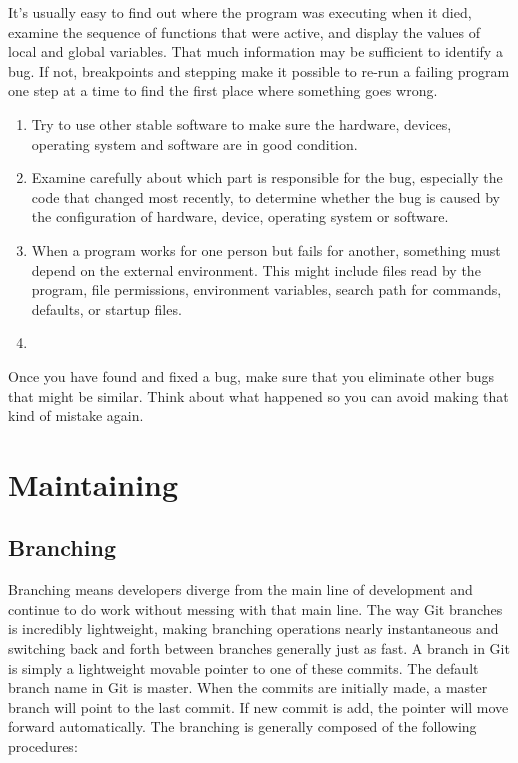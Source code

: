 \documentclass[draftclsnofoot,journal,onecolumn,12pt]{IEEEtran}
\begin{document}
It's usually easy to find out where the program was executing when it died, examine the sequence of functions that were active, and display the values of local and global variables. That much information may be sufficient to identify a bug. If not, breakpoints and stepping make it possible to re-run a failing program one step at a time to find the first place where something goes wrong.

\begin{enumerate}
  \item Try to use other stable software to make sure the hardware, devices, operating system and software are in good condition.
  \item Examine carefully about which part is responsible for the bug, especially the code that changed most recently, to determine whether the bug is caused by the configuration of hardware, device, operating system or software.
  \item When a program works for one person but fails for another, something must depend on the external environment. This might include files read by the program, file permissions, environment variables, search path for commands, defaults, or startup files.
  \item
\end{enumerate}
Once you have found and fixed a bug, make sure that you eliminate other bugs that might be similar. Think about what happened so you can avoid making that kind of mistake again.

\section{Maintaining}


\subsection{Branching}
Branching means developers diverge from the main line of development and continue to do work without messing with that main line. The way Git branches is incredibly lightweight, making branching operations nearly instantaneous and switching back and forth between branches generally just as fast. A branch in Git is simply a lightweight movable pointer to one of these commits. The default branch name in Git is master. When the commits are initially made, a master branch will point to the last commit. If new commit is add, the pointer will move forward automatically. The branching is generally composed of the following procedures:
\end{document}
